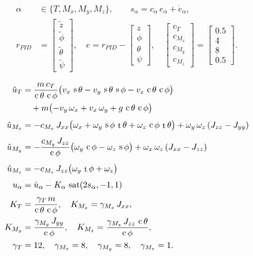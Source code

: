 \documentclass[conf]{new-aiaa}
\DeclareMathOperator{\s}{s}
\DeclareMathOperator{\cs}{c}
\DeclareMathOperator{\tn}{t}
\DeclareMathOperator{\sat}{sat}
\begin{document}
\begin{samepage}
\small
\begin{equation}
\label{eq:smc-defs}
\begin{aligned}
\alpha &\in \{T, M_x, M_y, M_z\}, \qquad s_\alpha = c_\alpha\, e_\alpha + \dot{e}_\alpha, \\
r_{PID} &= \begin{bmatrix} \tilde{z} \\ \tilde{\phi} \\ \tilde{\theta} \\ \tilde{\psi} \end{bmatrix},
\quad
e = r_{PID} - \begin{bmatrix} z \\ \phi \\ \theta \\ \psi \end{bmatrix}, \quad
\begin{bmatrix} c_T \\ c_{M_x} \\ c_{M_y} \\ c_{M_z} \end{bmatrix}
= \begin{bmatrix} 0.5 \\ 4 \\ 8 \\ 0.5 \end{bmatrix}.
\end{aligned}
\end{equation}

\begin{align}
\hat{u}_T
&= \frac{m\,c_T}{\cs\theta\,\cs\phi}\bigl(v_x\,\s\theta - v_y\,\s\theta\,\s\phi - v_z\,\cs\theta\,\cs\phi\bigr) \notag \\
&\quad + m\bigl(-v_y\,\omega_x + v_x\,\omega_y + g\,\cs\theta\,\cs\phi\bigr)
\label{eq:smc1} \\[4pt]
\hat{u}_{M_x}
&= -c_{M_x}\, J_{xx}\bigl(\omega_x + \omega_y\,\s\phi\,\tn\theta + \omega_z\,\cs\phi\,\tn\theta\bigr) + \omega_y\,\omega_z\,(J_{zz} - J_{yy})
\label{eq:smc2} \\[4pt]
\hat{u}_{M_y}
&= -\frac{c_{M_y}\, J_{zz}}{\cs\phi}\bigl(\omega_y\,\cs\phi - \omega_z\,\s\phi\bigr) + \omega_x\,\omega_z\,(J_{xx} - J_{zz})
\label{eq:smc3} \\[4pt]
\hat{u}_{M_z}
&= -c_{M_z}\, J_{zz}\bigl(\omega_y\,\tn\phi + \omega_z\bigr)
\label{eq:smc4} \\[4pt]
u_\alpha
&= \hat{u}_\alpha - K_\alpha\,\sat(2s_\alpha,-1,1)
\label{eq:smc5} \\[4pt]
K_T &= \frac{\gamma_T\,m}{\cs\theta\,\cs\phi}, \quad K_{M_x} = \gamma_{M_x}\,J_{xx}, \notag \\
K_{M_y} &= \frac{\gamma_{M_y}\,J_{yy}}{\cs\phi}, \quad K_{M_z} = \frac{\gamma_{M_z}\,J_{zz}\,\cs\theta}{\cs\phi}, \notag \\
\gamma_T &= 12, \quad \gamma_{M_x} = 8, \quad \gamma_{M_y} = 8, \quad \gamma_{M_z} = 1.
\label{eq:smc-constants2}
\end{align}
\normalsize
\end{samepage}
\end{document}
